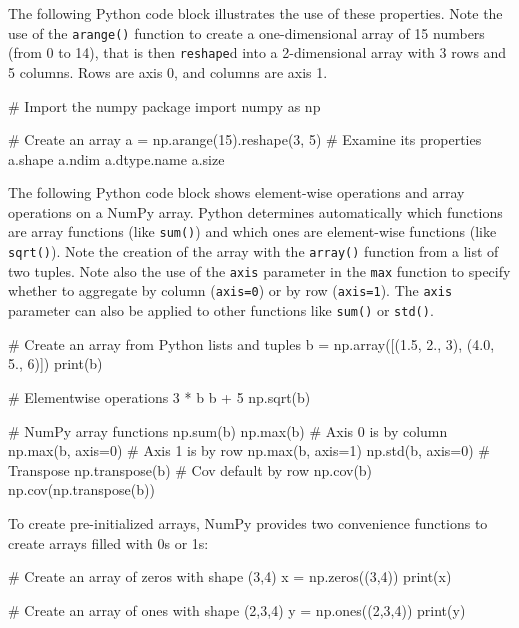 The following Python code block illustrates the use of these properties. Note the use of the \texttt{arange()} function to create a one-dimensional array of 15 numbers (from 0 to 14), that is then \texttt{reshape}d into a 2-dimensional array with 3 rows and 5 columns. Rows are axis 0, and columns are axis 1.

\begin{pythoncode}
# Import the numpy package
import numpy as np

# Create an array
a = np.arange(15).reshape(3, 5)
# Examine its properties
a.shape
a.ndim
a.dtype.name
a.size
\end{pythoncode}

The following Python code block shows element-wise operations and array operations on a NumPy array. Python determines automatically which functions are array functions (like \texttt{sum()}) and which ones are element-wise functions (like \texttt{sqrt()}). Note the creation of the array with the \texttt{array()} function from a list of two tuples. Note also the use of the \texttt{axis} parameter in the \texttt{max} function to specify whether to aggregate by column (\texttt{axis=0}) or by row (\texttt{axis=1}). The \texttt{axis} parameter can also be applied to other functions like \texttt{sum()} or \texttt{std()}.

\begin{pythoncode}
# Create an array from Python lists and tuples
b = np.array([(1.5, 2., 3), 
              (4.0, 5., 6)])
print(b)

# Elementwise operations
3 * b
b + 5
np.sqrt(b)

# NumPy array functions
np.sum(b)
np.max(b)
# Axis 0 is by column
np.max(b, axis=0)
# Axis 1 is by row
np.max(b, axis=1)
np.std(b, axis=0)
# Transpose
np.transpose(b)
# Cov default by row
np.cov(b)
np.cov(np.transpose(b))
\end{pythoncode}


To create pre-initialized arrays, NumPy provides two convenience functions to create arrays filled with 0s or 1s:
\begin{pythoncode}
# Create an array of zeros with shape (3,4)
x = np.zeros((3,4))
print(x)

# Create an array of ones with shape (2,3,4)
y = np.ones((2,3,4))
print(y)
\end{pythoncode}

